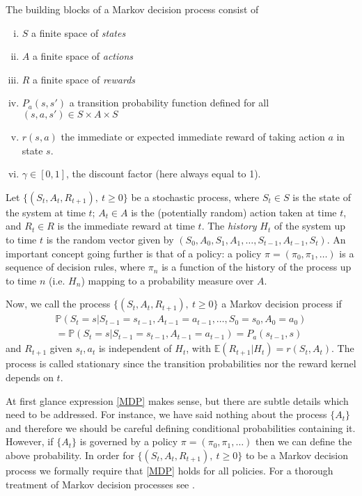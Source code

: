The building blocks of a Markov decision process consist of
\begin{enumerate}[(i)]
	\item  $S$ a finite space of \textit{states}
	\item  $A$ a finite space of \textit{actions}
	\item  $R$ a finite space of \textit{rewards}
	\item  $P_a(s,s')$ a transition probability function defined for all  $(s,a,s') \in S\times A \times S$
	\item  $r(s,a)$ the immediate or expected immediate reward of taking action $a$ in state $s$.
	\item  $\gamma \in [0,1]$, the discount factor (here always equal to 1).
\end{enumerate}
Let  $\{(S_t,A_t, R_{t+1}),\ t\geq 0  \}$ be a stochastic process, where $S_t \in S$ is the state of the system at time $t$; $A_t \in A$ is the (potentially random) action taken at time $t$, and $R_t \in R$ is the immediate reward at time $t$.
The \textit{history} $H_t$ of the system up to time $t$ is the random vector given by $(S_0, A_0, S_1, A_1, \ldots,S_{t-1}, A_{t-1}, S_t )$.
An important concept going further is that of a policy: 
a policy $\pi = (\pi_0, \pi_1,\ldots)$ is a sequence of decision rules, where $\pi_n$ is a function of the history of the process up to time $n$ (i.e. $H_n$) mapping to a probability measure over $A$.

Now, we call the process $\{(S_t,A_t, R_{t+1}),\ t\geq 0  \}$ a Markov decision process if
\begin{multline}
\label{MDP}
	\mathbb{P}(S_t = s|  S_{t-1} = s_{t-1}, A_{t-1} = a_{t-1},\ldots, S_0 = s_0, A_0 = a_0   ) \\
	= \mathbb{P}(S_t = s|  S_{t-1} = s_{t-1}, A_{t-1} = a_{t-1}  ) = P_a (s_{t-1},s)
\end{multline}
and $R_{t+1}$ given $s_t,a_t$ is independent of $H_t$, with $\mathbb{E}(R_{t+1} | H_t) = r(S_t,A_t)$. The process is called stationary since the transition probabilities nor the reward kernel depends on $t$.

At first glance expression \eqref{MDP} makes sense, but there are subtle details which need to be addressed. For instance, we have said nothing about the process $\{A_t \}$ and therefore we should be careful defining conditional probabilities containing it. However, if $\{A_t \}$ is governed by a policy $\pi = (\pi_0,\pi_1,\ldots)$ then we can define the above probability. In order for $\{(S_t,A_t, R_{t+1}),\ t\geq 0  \}$ to be a Markov decision process we formally require that \eqref{MDP} holds for all policies. For a thorough treatment of Markov decision processes see \cite{Puterman}.

